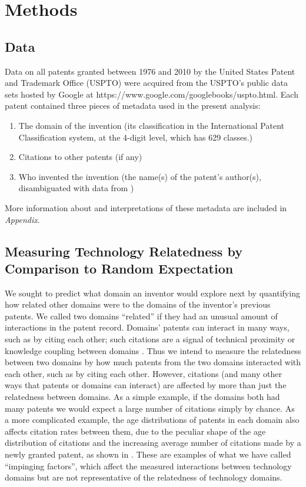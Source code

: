 \documentclass{dsj}
\begin{document}
\section*{Methods}
\subsection*{Data}
Data on all patents granted between 1976 and 2010 by the United States Patent and Trademark Office (USPTO) were acquired from the USPTO's public data sets hosted by Google at https://www.google.com/googlebooks/uspto.html. 
Each patent contained three pieces of metadata used in the present analysis:
\begin{enumerate}
    \item The domain of the invention (its classification in the International Patent Classification system, at the 4-digit level, which has 629 classes.)
    \item Citations to other patents (if any)
    \item Who invented the invention (the name(s) of the patent's author(s), disambiguated with data from \cite{Li2014})
\end{enumerate}

More information about and interpretations of these metadata are included in \textit{Appendix}.

\subsection*{Measuring Technology Relatedness by Comparison to Random Expectation}\label{expectation_calculation}

We sought to predict what domain an inventor would explore next by quantifying how related other domains were to the domains of the inventor's previous patents. We called two domains ``related'' if they had an unusual amount of interactions in the patent record. Domains' patents can interact in many ways, such as by citing each other; such citations are a signal of technical proximity or knowledge coupling between domains \cite{Jaffe2002,Jaffe2016, Verspagen1997}. Thus we intend to measure the relatedness between two domains by how much patents from the two domains interacted with each other, such as by citing each other. However, citations (and many other ways that patents or domains can interact) are affected by more than just the relatedness between domains. As a simple example, if the domains both had many patents we would expect a large number of citations simply by chance. As a more complicated example, the age distributions of patents in each domain also affects citation rates between them, due to the peculiar shape of the age distribution of citations and the increasing average number of citations made by a newly granted patent, as shown in \cite{Alstott2017, Valverde2007, Jaffe2002, Hall2001}. These are examples of what we have called ``impinging factors'', which affect the measured interactions between technology domains but are not representative of the relatedness of technology domains.
\end{document}
